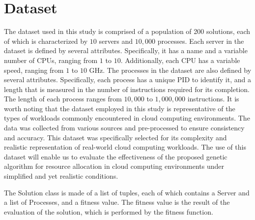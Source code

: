\section{Dataset}\label{sect:dtst}

The dataset used in this study is comprised of a population of 200 solutions, each of which is characterized by $10$ servers and $10,000$ processes. 
Each server in the dataset is defined by several attributes. 
Specifically, it has a name and a variable number of CPUs, ranging from $1$ to $10$. 
Additionally, each CPU has a variable speed, ranging from $1$ to $10$ GHz. 
The processes in the dataset are also defined by several attributes. 
Specifically, each process has a unique PID to identify it, and a length that is measured in the number of instructions required for its completion. 
The length of each process ranges from $10,000$ to $1,000,000$ instructions. 
It is worth noting that the dataset employed in this study is representative of the types of workloads commonly encountered in cloud computing environments. 
The data was collected from various sources and pre-processed to ensure consistency and accuracy. 
This dataset was specifically selected for its complexity and realistic representation of real-world cloud computing workloads. 
The use of this dataset will enable us to evaluate the effectiveness of the proposed genetic algorithm for resource allocation in cloud computing 
environments under simplified and yet realistic conditions.

%
%
%
%

The Solution class is made of a list of tuples, each of which contains a Server and a list of Processes, and a fitness value.
The fitness value is the result of the evaluation of the solution, which is performed by the fitness function.


\newpage